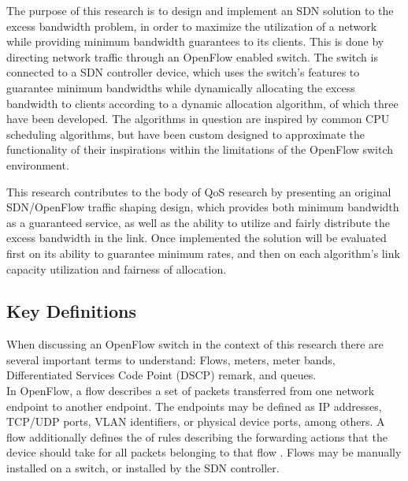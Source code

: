 \documentclass[accepted,single]{gipaper}
\begin{document}
\hspace{10mm} The purpose of this research is to design and implement an SDN solution to the excess bandwidth problem, in order to maximize the utilization of a network while providing minimum bandwidth guarantees to its clients. This is done by directing network traffic through an OpenFlow enabled switch. The switch is connected to a SDN controller device, which uses the switch's features to guarantee minimum bandwidths while dynamically allocating the excess bandwidth to clients according to a dynamic allocation algorithm, of which three have been developed. The algorithms in question are inspired by common CPU scheduling algorithms, but have been custom designed to approximate the functionality of their inspirations within the limitations of the OpenFlow switch environment.

\hspace{10mm} This research contributes to the body of QoS research by presenting an original SDN/OpenFlow traffic shaping design, which provides both minimum bandwidth as a guaranteed service, as well as the ability to utilize and fairly distribute the excess bandwidth in the link. Once implemented the solution will be evaluated first on its ability to guarantee minimum rates, and then on each algorithm's link capacity utilization and fairness of allocation.


\subsection{Key Definitions}
\label{definitions}

When discussing an OpenFlow switch in the context of this research there are several important terms to understand: Flows, meters, meter bands, Differentiated Services Code Point (DSCP) remark, and queues.
\\

In OpenFlow, a flow describes a set of packets transferred from one network endpoint to another endpoint. The endpoints may be defined as IP addresses, TCP/UDP ports, VLAN identifiers, or physical device ports, among others. A flow additionally defines the of rules describing the forwarding actions that the device should take for all packets belonging to that flow \cite{flowdef}. Flows may be manually installed on a switch, or installed by the SDN controller.
\end{document}
